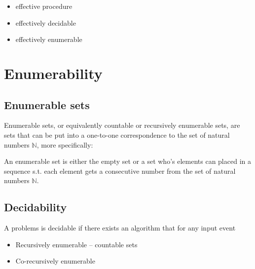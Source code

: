 


\begin{itemize}

\item effective procedure

\item effectively decidable

\item effectively enumerable

\end{itemize}


\section{Enumerability}

\subsection{Enumerable sets}

Enumerable sets, or equivalently countable or recursively enumerable sets, are
sets that can be put into a one-to-one correspondence to the set of natural
numbers $\mathbb{N}$, more specifically:

\begin{definition} An enumerable set is either the empty set or a set who's
elements can placed in a sequence s.t. each element gets a consecutive number
from the set of natural numbers $\mathbb{N}$.\end{definition}

\subsection{Decidability}

\begin{definition} A problems is decidable if there exists an algorithm that for any input event
\end{definition}

\begin{itemize}

\item Recursively enumerable -- countable sets

\item Co-recursively enumerable

\end{itemize}

